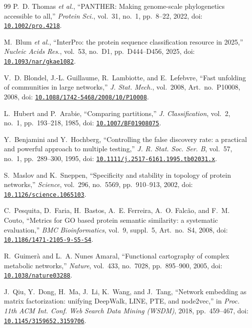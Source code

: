 \documentclass[conference]{IEEEtran}
\begin{document}
\begin{thebibliography}{99}
P.~D. Thomas \emph{et al.}, ``PANTHER: Making genome-scale phylogenetics accessible to all,''
\emph{Protein Sci.}, vol.~31, no.~1, pp.~8--22, 2022,
doi: \href{https://doi.org/10.1002/pro.4218}{\nolinkurl{10.1002/pro.4218}}.

M.~Blum \emph{et al.}, ``InterPro: the protein sequence classification resource in 2025,''
\emph{Nucleic Acids Res.}, vol.~53, no.~D1, pp.~D444--D456, 2025,
doi: \href{https://doi.org/10.1093/nar/gkae1082}{\nolinkurl{10.1093/nar/gkae1082}}.

V.~D. Blondel, J.-L. Guillaume, R.~Lambiotte, and E.~Lefebvre, ``Fast unfolding of communities in
large networks,'' \emph{J. Stat. Mech.}, vol.~2008, Art.~no.~P10008, 2008,
doi: \href{https://doi.org/10.1088/1742-5468/2008/10/P10008}{\nolinkurl{10.1088/1742-5468/2008/10/P10008}}.

L.~Hubert and P.~Arabie, ``Comparing partitions,'' \emph{J. Classification}, vol.~2, no.~1,
pp.~193--218, 1985,
doi: \href{https://doi.org/10.1007/BF01908075}{\nolinkurl{10.1007/BF01908075}}.

Y.~Benjamini and Y.~Hochberg, ``Controlling the false discovery rate: a practical and powerful
approach to multiple testing,'' \emph{J. R. Stat. Soc. Ser. B}, vol.~57, no.~1, pp.~289--300,
1995, doi: \href{https://doi.org/10.1111/j.2517-6161.1995.tb02031.x}{\nolinkurl{10.1111/j.2517-6161.1995.tb02031.x}}.

S.~Maslov and K.~Sneppen, ``Specificity and stability in topology of protein networks,''
\emph{Science}, vol.~296, no.~5569, pp.~910--913, 2002,
doi: \href{https://doi.org/10.1126/science.1065103}{\nolinkurl{10.1126/science.1065103}}.

C.~Pesquita, D.~Faria, H.~Bastos, A.~E. Ferreira, A.~O. Falc\~{a}o, and F.~M. Couto,
``Metrics for GO based protein semantic similarity: a systematic evaluation,'' \emph{BMC
Bioinformatics}, vol.~9, suppl.~5, Art.~no.~S4, 2008,
doi: \href{https://doi.org/10.1186/1471-2105-9-S5-S4}{\nolinkurl{10.1186/1471-2105-9-S5-S4}}.

R.~Guimer\`{a} and L.~A. Nunes Amaral, ``Functional cartography of complex metabolic networks,''
\emph{Nature}, vol.~433, no.~7028, pp.~895--900, 2005,
doi: \href{https://doi.org/10.1038/nature03288}{\nolinkurl{10.1038/nature03288}}.

J.~Qiu, Y.~Dong, H.~Ma, J.~Li, K.~Wang, and J.~Tang, ``Network embedding as matrix factorization:
unifying DeepWalk, LINE, PTE, and node2vec,'' in \emph{Proc. 11th ACM Int. Conf. Web Search Data
Mining (WSDM)}, 2018, pp.~459--467,
doi: \href{https://doi.org/10.1145/3159652.3159706}{\nolinkurl{10.1145/3159652.3159706}}.


\end{thebibliography}
\end{document}
